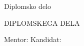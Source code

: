 
\begin{center}
  \large
  \univerza

  \fakulteta

  \oddelek
\end{center}

\vspace{3cm}


\begin{center}
  {\Large Diplomsko delo}

  \vspace{1cm}
  {\Huge \bfseries \podnaslov}
    \vspace{1cm} DIPLOMSKEGA DELA


    \vspace{5cm}

    \begin{flushleft}
      Mentor:  Kandidat:


      \mentor  {} \kandidat
    \end{flushleft}


    \vspace{3cm}
    {\large \datum}
  \end{center}



